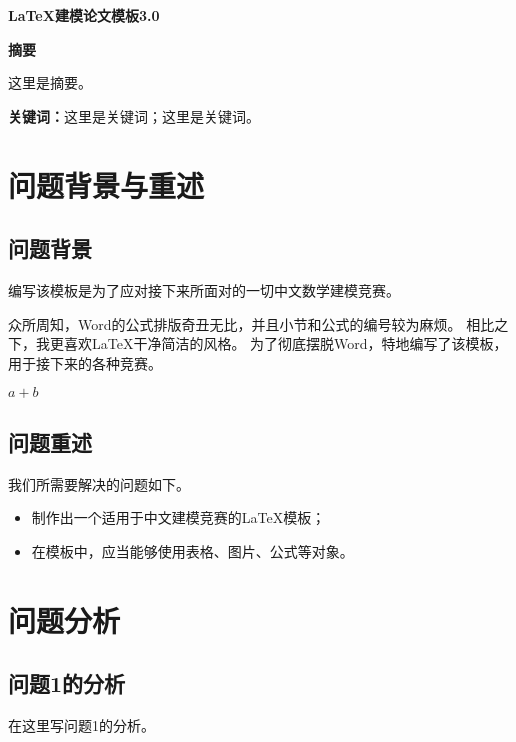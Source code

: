\documentclass[12pt, a4paper, oneside]{ctexart}
\begin{document}
\pagestyle{empty}
\setcounter{page}{0}

\begin{center}
    \Large{\textbf{\LaTeX 建模论文模板3.0}}
\end{center}

\begin{center}
    \Large{\textbf{摘要}}
\end{center}

这里是摘要。

\textbf{关键词：}这里是关键词；这里是关键词。

\newpage
\setcounter{page}{1}
\pagestyle{plain}
\fancyfoot[C]{\thepage}

\section{问题背景与重述}

\subsection{问题背景}

编写该模板是为了应对接下来所面对的一切中文数学建模竞赛。

众所周知，Word的公式排版奇丑无比，并且小节和公式的编号较为麻烦。
相比之下，我更喜欢\LaTeX 干净简洁的风格。
为了彻底摆脱Word，特地编写了该模板，用于接下来的各种竞赛。

$a+b$

\subsection{问题重述}

我们所需要解决的问题如下。
\begin{itemize}
    \item 制作出一个适用于中文建模竞赛的\LaTeX 模板；
    \item 在模板中，应当能够使用表格、图片、公式等对象。
\end{itemize}

\section{问题分析}

\subsection{问题1的分析}

在这里写问题1的分析。
\end{document}
